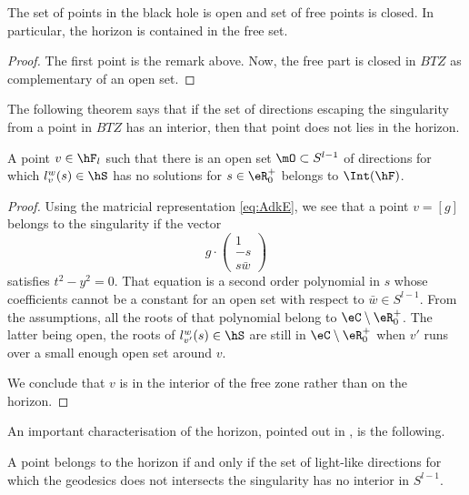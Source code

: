 \begin{proposition}		\label{PropBHouvertLibreFerme}
	The set of points in the black hole is open and set of free points is closed. In particular, the horizon is contained in the free set.
\end{proposition}

\begin{proof}
	The first point is the remark above. Now, the free part is closed in $BTZ$ as complementary of an open set.
\end{proof}

The following theorem says that if the set of directions escaping the singularity from a point in $BTZ$ has an interior, then that point does not lies in the horizon.
\begin{proposition}		\label{PropvFOsvghorvec}
	A point $v\in\hF_l$ such that there is an open set $\mO\subset S^{l-1}$ of directions for which $l^{w}_v(s)\in\hS$ has no solutions for $s\in\eR^+_0$ belongs to $\Int(\hF)$.
\end{proposition}

\begin{proof}
	Using the matricial representation \eqref{eq:AdkE}, we see that a point $v=[g]$ belongs to the singularity if the vector
	\begin{equation}
		g\cdot \begin{pmatrix}
			1	\\
			-s	\\
			s\bar w
		\end{pmatrix}
	\end{equation}
	satisfies $t^2-y^2=0$. That equation is a second order polynomial in $s$ whose coefficients cannot be a constant for an open set with respect to $\bar w\in S^{l-1}$. From the assumptions, all the roots of that polynomial belong to $\eC\setminus\eR^+_0$. The latter being open, the roots of $l_{v'}^w(s)\in\hS$ are still in $\eC\setminus\eR^+_0$ when $v'$ runs over a small enough open set around $v$.

	We conclude that $v$ is in the interior of the free zone rather than on the horizon.
\end{proof}

An important characterisation of the horizon, pointed out in \cite{Keio}, is the following.
\begin{theorem}		\label{ThoHorIntDansS}
	A point belongs to the horizon if and only if the set of light-like directions for which the geodesics does not intersects the singularity has no interior in $S^{l-1}$.
\end{theorem}



